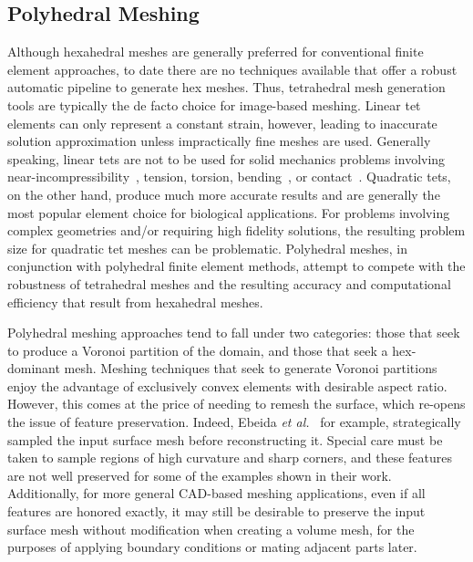 \subsection{Polyhedral Meshing}
\label{Polyhedral Meshing}

Although hexahedral meshes are generally preferred for conventional finite element approaches, to date there are no techniques available that offer a robust automatic pipeline to generate hex meshes. Thus, tetrahedral mesh generation tools are typically the de facto choice for image-based meshing. Linear tet elements can only represent a constant strain, however, leading to inaccurate solution approximation unless impractically fine meshes are used. Generally speaking, linear tets are not to be used for solid mechanics problems involving near-incompressibility~\cite{hughes_2007}, tension, torsion, bending~\cite{wang_2004, benzley_1995}, or contact~\cite{maas_2016}. Quadratic tets, on the other hand, produce much more accurate results and are generally the most popular element choice for biological applications. For problems involving complex geometries and/or requiring high fidelity solutions, the resulting problem size for quadratic tet meshes can be problematic. Polyhedral meshes, in conjunction with polyhedral finite element methods, attempt to compete with the robustness of tetrahedral meshes and the resulting accuracy and computational efficiency that result from hexahedral meshes.

Polyhedral meshing approaches tend to fall under two categories: those that seek to produce a Voronoi partition of the domain, and those that seek a hex-dominant mesh. Meshing techniques that seek to generate Voronoi partitions~\cite{garimella_2014, lee_2015} enjoy the advantage of exclusively convex elements with desirable aspect ratio. However, this comes at the price of needing to remesh the surface, which re-opens the issue of feature preservation. Indeed, Ebeida \textit{et al.}~\cite{ebeida_2011, mitchell_2015} for example, strategically sampled the input surface mesh before reconstructing it. Special care must be taken to sample regions of high curvature and sharp corners, and these features are not well preserved for some of the examples shown in their work. Additionally, for more general CAD-based meshing applications, even if all features are honored exactly, it may still be desirable to preserve the input surface mesh without modification when creating a volume mesh, for the purposes of applying boundary conditions or mating adjacent parts later.

